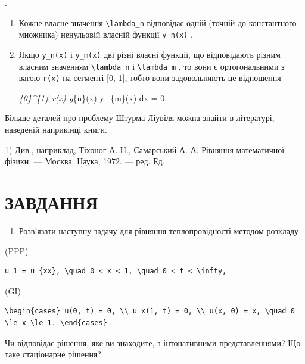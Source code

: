 \documentclass[
  ukrainian,
]{article}
\providecommand{\tightlist}{%
  \setlength{\itemsep}{0pt}\setlength{\parskip}{0pt}}
\begin{document}
.

\begin{enumerate}
\def\labelenumi{\arabic{enumi}.}
\setcounter{enumi}{1}
\item
  Кожне власне значення \texttt{\textbackslash{}lambda\_n} відповідає
  одній (точній до константного множника) ненульовій власній функції
  \texttt{y\_n(x)} .
\item
  Якщо \texttt{y\_n(x)} і \texttt{y\_m(x)} дві різні власні функції, що
  відповідають різним власним значенням
  \texttt{\textbackslash{}lambda\_n} і
  \texttt{\textbackslash{}lambda\_m} , то вони є ортогональними з вагою
  \texttt{r(x)} на сегменті {[}0, 1{]}, тобто вони задовольняють це
  відношення

  \int\emph{\{0\}\^{}\{1\} r(x) y}\{n\}(x) y\_\{m\}(x) dx = 0.
\end{enumerate}

Більше деталей про проблему Штурма-Ліувіля можна знайти в літературі,
наведеній наприкінці книги.

1) Див., наприклад, Тіхоног А. Н., Самарський А. А. Рівняння
математичної фізики. --- Москва: Наука, 1972. --- ред. Ед.

\section{ЗАВДАННЯ}\label{ux437ux430ux432ux434ux430ux43dux43dux44f-4}

\begin{enumerate}
\def\labelenumi{\arabic{enumi}.}
\tightlist
\item
  Розв'язати наступну задачу для рівняння теплопровідності методом
  розкладу
\end{enumerate}

(PPP)

\begin{verbatim}
u_1 = u_{xx}, \quad 0 < x < 1, \quad 0 < t < \infty,
\end{verbatim}

(GI)

\begin{verbatim}
\begin{cases} u(0, t) = 0, \\ u_x(1, t) = 0, \\ u(x, 0) = x, \quad 0 \le x \le 1. \end{cases}
\end{verbatim}

Чи відповідає рішення, яке ви знаходите, з інтонативними
представленнями? Що таке стаціонарне рішення?
\end{document}
